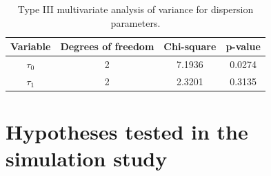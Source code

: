\documentclass[AMA,STIX1COL]{WileyNJD-v2}
\begin{document}
\begin{table}[H]
\centering
\begin{tabular}{cccc}
\hline
Variable               & Degrees of freedom & Chi-square & p-value        \\ \hline
$\tau_0$ & 2                  & 7.1936       & 0.0274  \\
$\tau_1$ & 2                  & 2.3201       & 0.3135         \\ \hline
\end{tabular}
\caption{Type III multivariate analysis of variance for dispersion parameters.}
\label{tab8}
\end{table}

\appendix

\section{Hypotheses tested in the simulation study\label{app1}}

\end{document}
